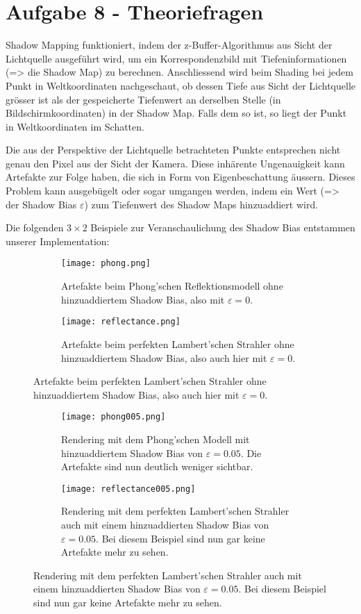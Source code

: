 \documentclass{article} %
\begin{document}
\section*{Aufgabe 8 - Theoriefragen}

Shadow Mapping funktioniert, indem der z-Buffer-Algorithmus aus Sicht der Lichtquelle ausgeführt wird, um ein Korrespondenzbild mit Tiefeninformationen (=> die Shadow Map) zu berechnen. Anschliessend wird beim Shading bei jedem Punkt in Weltkoordinaten nachgeschaut, ob dessen Tiefe aus Sicht der Lichtquelle grösser ist als der gespeicherte Tiefenwert an derselben Stelle (in Bildschirmkoordinaten) in der Shadow Map. Falls dem so ist, so liegt der Punkt in Weltkoordinaten im Schatten.

Die aus der Perspektive der Lichtquelle betrachteten Punkte entsprechen nicht genau den Pixel aus der Sicht der Kamera. Diese inhärente Ungenauigkeit kann Artefakte zur Folge haben, die sich in Form von Eigenbeschattung äussern. Dieses Problem kann ausgebügelt oder sogar umgangen werden, indem ein Wert (=> der Shadow Bias $\varepsilon$) zum Tiefenwert des Shadow Maps hinzuaddiert wird.

Die folgenden $3 \times 2$ Beispiele zur Veranschaulichung des Shadow Bias entstammen unserer Implementation:

\vspace{1.5cm}

\begin{figure}[H]
     \centering
     \begin{subfigure}[b]{0.4\textwidth}
         \centering
         \texttt{[image: phong.png]}
         \caption{Artefakte beim Phong'schen Reflektionsmodell ohne hinzuaddiertem Shadow Bias, also mit $\varepsilon = 0$.}
         \label{fig:y equals x}
     \end{subfigure}
     \hfill
     \begin{subfigure}[b]{0.4\textwidth}
         \centering
         \texttt{[image: reflectance.png]}
         \caption{Artefakte beim perfekten Lambert'schen Strahler ohne hinzuaddiertem Shadow Bias, also auch hier mit $\varepsilon = 0$.}
         \label{fig:three sin x}
     \end{subfigure}
\end{figure}

\begin{figure}[H]
     \centering
     \begin{subfigure}[b]{0.4\textwidth}
         \centering
         \texttt{[image: phong005.png]}
         \caption{Rendering mit dem Phong'schen Modell mit hinzuaddiertem Shadow Bias von $\varepsilon = 0.05$. Die Artefakte sind nun deutlich weniger sichtbar.}
     \end{subfigure}
     \hfill
     \begin{subfigure}[b]{0.4\textwidth}
         \centering
         \texttt{[image: reflectance005.png]}
         \caption{Rendering mit dem perfekten Lambert'schen Strahler auch mit einem hinzuaddierten Shadow Bias von $\varepsilon = 0.05$. Bei diesem Beispiel sind nun gar keine Artefakte mehr zu sehen.}
     \end{subfigure}
\end{figure}
\end{document}
